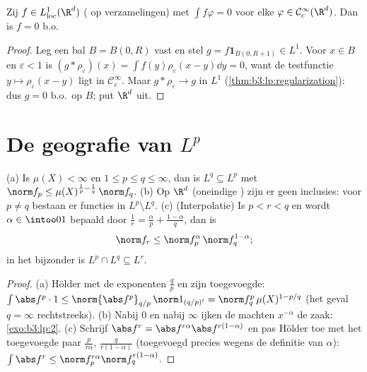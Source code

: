 \begin{corollary}\label{cor:b3:lp:fundlemma}
Zij $f \in L^1_{\mathrm{loc}}(\R^d)$ ( op 
verzamelingen) met $\int f\varphi = 0$ voor elke $\varphi \in
\mathcal C^\infty_c(\R^d)$. Dan is $f = 0$ b.o.
\end{corollary}

\begin{proof}
Leg een bal $B = B(0, R)$ vast en stel $g = f\mathbf 1_{B(0,
R+1)} \in L^1$. Voor $x \in B$ en $\varepsilon < 1$ is $(g *
\rho_\varepsilon)(x) = \int f(y)\rho_\varepsilon(x - y)\dd y =
0$, want de testfunctie $y \mapsto \rho_\varepsilon(x-y)$ ligt in
$\mathcal C_c^\infty$. Maar $g * \rho_\varepsilon \to g$ in $L^1$
(\cref{thm:b3:lp:regularization}): dus $g = 0$ b.o.\ op $B$; put
$\R^d$ uit.
\end{proof}

\section{De geografie van \texorpdfstring{$L^p$}{Lp}}

\begin{proposition}\label{prop:b3:lp:inclusions}
(a) Is $\mu(X) < \infty$ en $1 \leq p \leq q \leq \infty$, dan is
$L^q \subseteq L^p$ met $\norm f_p \leq \mu(X)^{\frac1p -
\frac1q}\,\norm f_q$.
(b) Op $\R^d$ (oneindige ) zijn er geen inclusies: voor $p
\neq q$ bestaan er functies in $L^p\setminus L^q$.
(c) (Interpolatie) Is $p < r < q$ en wordt $\alpha \in \intoo01$
bepaald door $\frac1r = \frac\alpha p + \frac{1 - \alpha}q$, dan
is
\[
\norm f_r \leq \norm f_p^{\alpha}\,\norm f_q^{1 - \alpha} ;
\]
in het bijzonder is $L^p \cap L^q \subseteq L^r$.
\end{proposition}

\begin{proof}
(a) Hölder met de exponenten $\frac qp$ en zijn toegevoegde:
$\int\abs f^p\cdot 1 \leq \norm{\abs f^p}_{q/p}\,\norm
1_{(q/p)'} = \norm f_q^p\,\mu(X)^{1 - p/q}$ (het geval $q =
\infty$ rechtstreeks). (b) Nabij $0$ en nabij $\infty$ ijken de
machten $x^{-\alpha}$ de zaak: \cref{exo:b3:lp:2}. (c) Schrijf
$\abs f^r = \abs f^{r\alpha}\abs f^{r(1-\alpha)}$ en pas Hölder
toe met het toegevoegde paar $\frac p{r\alpha}$, $\frac
q{r(1-\alpha)}$ (toegevoegd precies wegens de definitie van
$\alpha$): $\int\abs f^r \leq \norm f_p^{r\alpha}\norm f_q^{r(1 -
\alpha)}$.
\end{proof}

